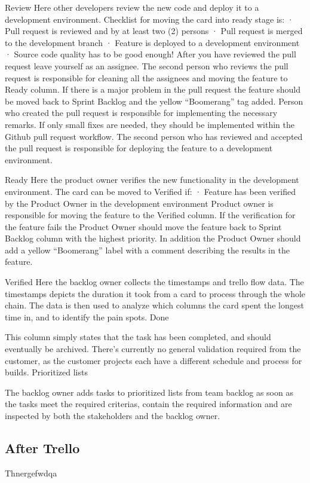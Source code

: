 \documentclass[english]{tktltiki2}
\theoremstyle{definition}
\theoremstyle{remark}
\begin{document}
Review
Here other developers review the new code and deploy it to a development environment. Checklist for moving the card into ready stage is:
·       Pull request is reviewed and by at least two (2) persons
·       Pull request is merged to the development branch
·       Feature is deployed to a development environment
·       Source code quality has to be good enough!
After you have reviewed the pull request leave yourself as an assignee. The second person who reviews the pull request is responsible for cleaning all the assignees and moving the feature to Ready column.
If there is a major problem in the pull request the feature should be moved back to Sprint Backlog and the yellow “Boomerang” tag added. Person who created the pull request is responsible for implementing the necessary remarks.
If only small fixes are needed, they should be implemented within the Github pull request workflow.
The second person who has reviewed and accepted the pull request is responsible for deploying the feature to a development environment.

Ready
Here the product owner verifies the new functionality in the development environment. The card can be moved to Verified if:
·       Feature has been verified by the Product Owner in the development environment
Product owner is responsible for moving the feature to the Verified column.
If the verification for the feature fails the Product Owner should move the feature back to Sprint Backlog column with the highest priority. In addition the Product Owner should add a yellow “Boomerang” label with a comment describing the results in the feature.

Verified
Here the backlog owner collects the timestamps and trello flow data. The timestamps depicts the duration it took from a card to process through the whole chain. The data is then used to analyze which columns the card spent the longest time in, and to identify the pain spots.
Done

This column simply states that the task has been completed, and should eventually be archived. There’s currently no general validation required from the customer, as the customer projects each have a different schedule and process for builds.
Prioritized lists

The backlog owner adds tasks to prioritized lists from team backlog as soon as the tasks meet the required criterias, contain the required information and are inspected by both the stakeholders and the backlog owner.

\subsection{After Trello}
Thnergefwdqa
\end{document}
